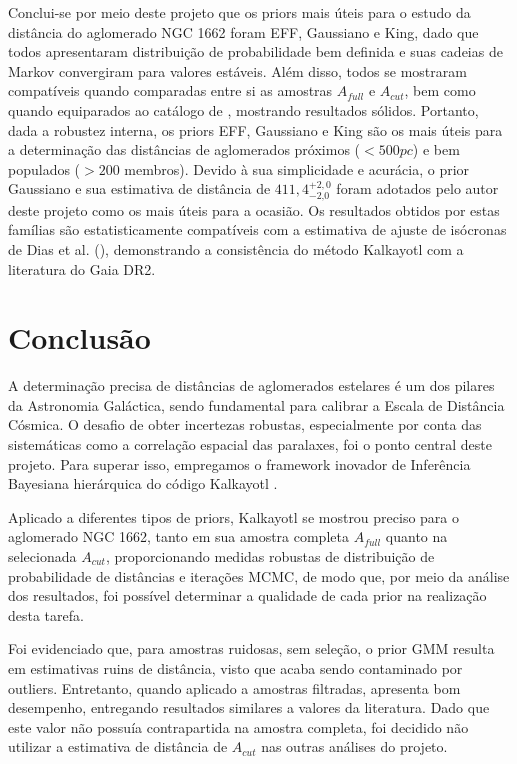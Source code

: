 \documentclass[12pt]{projeto}
\begin{document}
Conclui-se por meio deste projeto que os priors mais úteis para o estudo da distância do aglomerado NGC 1662 foram EFF, Gaussiano e King, dado que todos apresentaram distribuição de probabilidade bem definida e suas cadeias de Markov convergiram para valores estáveis. Além disso, todos se mostraram compatíveis quando comparadas entre si as amostras \(A_{full}\) e \(A_{cut}\), bem como quando equiparados ao catálogo de \cite{dias_updated_2021}, mostrando resultados sólidos. Portanto, dada a robustez interna, os priors EFF, Gaussiano e King são os mais úteis para a determinação das distâncias de aglomerados próximos (\(<500pc\)) e bem populados (\(>200\) membros). Devido à sua simplicidade e acurácia, o prior Gaussiano e sua estimativa de distância de $411,4^{+2,0}_{-\text{2,0}}$ foram adotados pelo autor deste projeto como os mais úteis para a ocasião. Os resultados obtidos por estas famílias são estatisticamente compatíveis com a estimativa de ajuste de isócronas de Dias et al. (\citeyear{dias_updated_2021}), demonstrando a consistência do método Kalkayotl com a literatura do Gaia DR2.

\section{Conclusão}

A determinação precisa de distâncias de aglomerados estelares é um dos pilares da Astronomia Galáctica, sendo fundamental para calibrar a Escala de Distância Cósmica. O desafio de obter incertezas robustas, especialmente por conta das sistemáticas como a correlação espacial das paralaxes, foi o ponto central deste projeto. Para superar isso, empregamos o framework inovador de Inferência Bayesiana hierárquica do código Kalkayotl \cite{olivares_kalkayotl_2020}.

Aplicado a diferentes tipos de priors, Kalkayotl se mostrou preciso para o aglomerado NGC 1662, tanto em sua amostra completa \(A_{full}\) quanto na selecionada \(A_{cut}\), proporcionando medidas robustas de distribuição de probabilidade de distâncias e iterações MCMC, de modo que, por meio da análise dos resultados, foi possível determinar a qualidade de cada prior na realização desta tarefa.

Foi evidenciado que, para amostras ruidosas, sem seleção, o prior GMM resulta em estimativas ruins de distância, visto que acaba sendo contaminado por outliers. Entretanto, quando aplicado a amostras filtradas, apresenta bom desempenho, entregando resultados similares a valores da literatura. Dado que este valor não possuía contrapartida na amostra completa, foi decidido não utilizar a estimativa de distância de \(A_{cut}\) nas outras análises do projeto.
\end{document}
